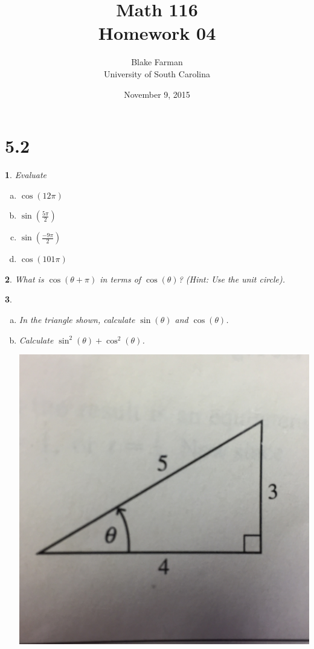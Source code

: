 \documentclass[12pt]{amsart}
\author{Blake Farman\\University of South Carolina}
\title{Math 116\\Homework 04}
\date{November 9, 2015}
\theoremstyle{plain}
\newtheorem{thm}{}
\begin{document}
\maketitle

\section*{5.2}

\setcounter{thm}{1}
\begin{thm}
Evaluate
\begin{enumerate}[(a)]
  \item 
    $\displaystyle{\cos(12\pi)}$
  \item
    $\displaystyle{\sin\left(\frac{5\pi}{2}\right)}$
  \item
    $\displaystyle{\sin\left(\frac{-9\pi}{2}\right)}$
  \item
    $\displaystyle{\cos(101\pi)}$
\end{enumerate}
\end{thm}

\setcounter{thm}{3}
\begin{thm}
  What is $\cos(\theta + \pi)$ in terms of $\cos(\theta)$? (Hint: Use the unit circle).
\end{thm}

\setcounter{thm}{5}
\begin{thm}
  \begin{enumerate}[(a)]
  \item
    In the triangle shown, calculate $\sin(\theta)$ and $\cos(\theta)$.
  \item
    Calculate $\sin^2(\theta) + \cos^2(\theta)$.

    \begin{center}
      \includegraphics[scale=0.05]{triangle.jpg}
    \end{center}
  \end{enumerate}
\end{thm}
\end{document}
